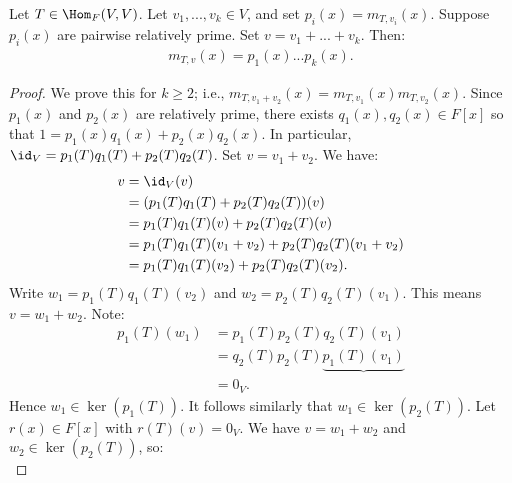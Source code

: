     \begin{lemma}
        Let $T \in \Hom_F{(V,V)}$. Let $v_1,...,v_k \in V$, and set $p_i(x) = m_{T,v_i}(x)$. Suppose $p_i(x)$ are pairwise relatively prime. Set $v = v_1+...+v_k$. Then:
            \begin{equation*}
            \begin{split}
                m_{T,v}(x) = p_1(x)...p_k(x).
            \end{split}
            \end{equation*}
    \end{lemma}
        \begin{proof}
            We prove this for $k \geq 2$; i.e., $m_{T,v_1 + v_2}(x) = m_{T,v_1}(x)m_{T,v_2}(x)$. Since $p_1(x)$ and $p_2(x)$ are relatively prime, there exists $q_1(x),q_2(x) \in F[x]$ so that $1 = p_1(x)q_1(x) + p_2(x)q_2(x)$. In particular, $\id_V = p_1(T)q_1(T) + p_2(T)q_2(T)$. Set $v = v_1 + v_2$. We have:
                \begin{equation*}
                \begin{split}
                    v
                    & = \id_V(v) \\
                    & = (p_1(T)q_1(T) + p_2(T)q_2(T))(v) \\
                    & = p_1(T)q_1(T)(v) + p_2(T)q_2(T)(v) \\
                    & = p_1(T)q_1(T)(v_1 + v_2) + p_2(T)q_2(T)(v_1 + v_2) \\
                    & = p_1(T)q_1(T)(v_2) + p_2(T)q_2(T)(v_2).
                \end{split}
                \end{equation*}
            Write $w_1 = p_1(T)q_1(T)(v_2)$ and $w_2 = p_2(T)q_2(T)(v_1)$. This means $v = w_1 + w_2$. Note:
                \begin{equation*}
                \begin{split}
                    p_1(T)(w_1)
                    & = p_1(T)p_2(T)q_2(T)(v_1) \\
                    & = q_2(T)p_2(T)\underbrace{p_1(T)(v_1)} \\
                    & = 0_V.
                \end{split}
                \end{equation*}
            Hence $w_1 \in \ker(p_1(T))$. It follows similarly that $w_1 \in \ker(p_2(T))$. Let $r(x) \in F[x]$ with $r(T)(v) = 0_V$. We have $v = w_1 + w_2$ and $w_2 \in \ker(p_2(T))$, so:
                \begin{equation*}

\end{equation*}
\end{proof}
